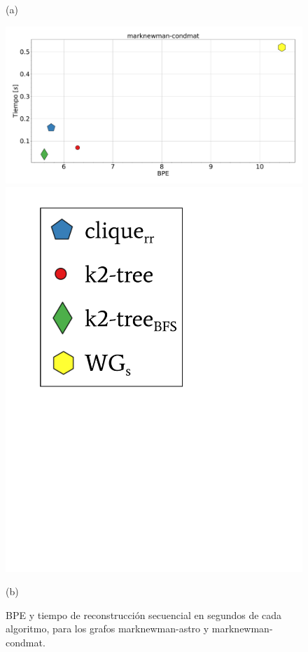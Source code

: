 \begin{figure}
\begin{minipage}{1\textwidth}
    			(a)		
    	\end{minipage}
    	
       	\begin{minipage}{1\textwidth}
    			\centering
    			\begin{minipage}{0.8\textwidth}
    				\centering
    				\includegraphics[width=1\linewidth]{img/bpeTimes/secuencial/marknewman-condmat.pdf}
    			\end{minipage}
    			\begin{minipage}{0.15\textwidth}
    				\centering
    				\includegraphics[scale=.24, clip, trim=70 320 230 30]{img/bpeTimes/labelSec.pdf}
    			\end{minipage}
    			
    			(b)		
    	\end{minipage}
    	
    \caption{BPE y tiempo de reconstrucción secuencial en segundos de cada algoritmo, para los grafos marknewman-astro y marknewman-condmat.}
    \label{fig:bpetSec1}
\end{figure}
